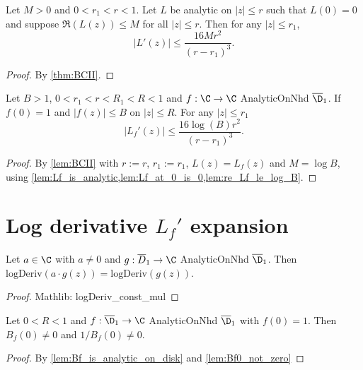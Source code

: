 
\begin{lemma}[BC inequality]\label{lem:BCII}  \leanok
Let $M>0$ and $0<r_1<r<1$. Let $L$ be analytic on $|z| \le r$ such that $L(0)=0$ and suppose $\Re(L(z)) \le M$ for all $|z| \le r$. Then for any $|z|\le r_1$,
\[ |L'(z)| \le \frac{16M r^2}{(r-r_1)^3}. \]
\end{lemma}
\begin{proof} 
\leanok
By \cref{thm:BCII}.
\end{proof}


\begin{lemma}[Apply BC]\label{lem:apply_BC_to_Lf}  \leanok
Let $B>1$, $0< r_1 < r<R_1<R<1$ and $f:\C\to\C$ AnalyticOnNhd $\overline{\D}_1$. If $f(0)=1$ and $|f(z)|\le B$ on $|z|\le R$. For any $|z|\le r_1$
\[ |L_f'(z)| \le \frac{16\log(B) r^2}{(r-r_1)^3}. \]
\end{lemma}
\begin{proof}
\leanok
By \cref{lem:BCII} with $r:=r$, $r_1:= r_1$, $L(z)=L_f(z)$ and $M=\log B$, using \cref{lem:Lf_is_analytic,lem:Lf_at_0_is_0,lem:re_Lf_le_log_B}.
\end{proof}



\section{Log derivative $L_f'$ expansion}

\begin{lemma}\label{lem:logDerivconst} 
\leanok
Let $a\in\C$ with $a\neq0$ and $g:\overline{D}_1\to\C$ AnalyticOnNhd $\overline{\D}_1$. Then $\text{logDeriv}(a\cdot g(z)) = \text{logDeriv}(g(z))$.
\end{lemma}
\begin{proof}
\leanok
Mathlib: logDeriv\_const\_mul
\end{proof}

\begin{lemma}\label{lem:1Bneq0} 
\leanok
Let $0<R<1$ and $f:\overline{\D}_1\to\C$ AnalyticOnNhd $\overline{\D}_1$ with $f(0)=1$. Then $B_f(0)\neq0$ and
$1/B_f(0)\neq0$.
\end{lemma}
\begin{proof}
\leanok
{}
By \cref{lem:Bf_is_analytic_on_disk} and \cref{lem:Bf0_not_zero}
\end{proof}

